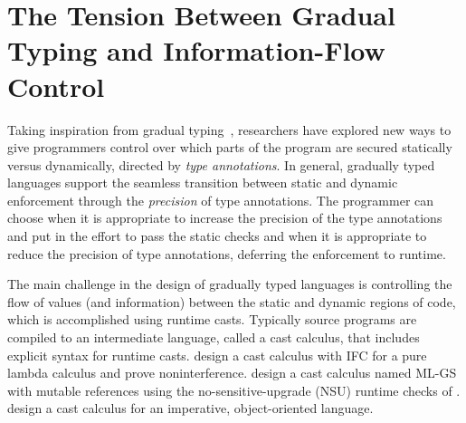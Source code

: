 
\section{The Tension Between Gradual Typing and Information-Flow Control}

Taking inspiration from gradual typing~\parencite{Siek:2006bh,Siek:2007qy},
researchers have explored new ways to give programmers control over which parts
of the program are secured statically versus dynamically, directed by
\textit{type annotations}.
%
In general, gradually typed languages support the seamless transition between
static and dynamic enforcement through the \textit{precision} of type
annotations. The programmer can choose when it is appropriate to increase the
precision of the type annotations and put in the effort to pass the static
checks and when it is appropriate to reduce the precision of type annotations,
deferring the enforcement to runtime.

The main challenge in the design of gradually typed languages is controlling the
flow of values (and information) between the static and dynamic regions of code,
which is accomplished using runtime casts. Typically source programs are
compiled to an intermediate language, called a cast calculus, that includes
explicit syntax for runtime casts. \textcite{Disney:2011fv} design a cast
calculus with IFC for a pure lambda calculus and prove noninterference.
\textcite{Fennell:2013ab} design a cast calculus named ML-GS with mutable
references using the no-sensitive-upgrade (NSU) runtime checks of
\textcite{austin2009efficient}. \textcite{Fennell:2015aa} design a cast calculus
for an imperative, object-oriented language.

